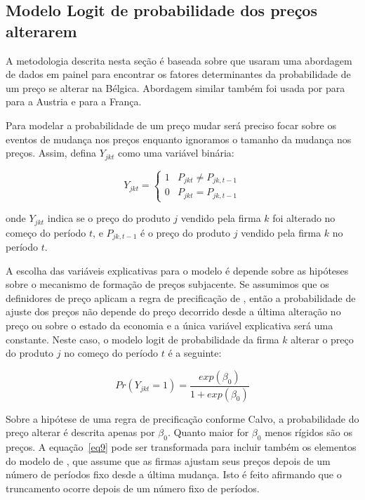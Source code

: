 \documentclass[twoside,a4paper,11pt]{report}
\begin{document}
\subsection*{Modelo Logit de probabilidade dos preços alterarem}

A metodologia descrita nesta seção é baseada sobre \citet{aucremanne2005time} que usaram uma abordagem de dados em painel para encontrar os fatores determinantes da probabilidade de um preço se alterar na Bélgica. Abordagem similar também foi usada por \citet{lunnemann2005consumer} para \citet{baumgartner2005frequently} para a Austria e \citet{baudry2004price} para a França.

Para modelar a probabilidade de um preço mudar será preciso focar sobre os eventos de mudança nos preços enquanto ignoramos o tamanho da mudança nos preços. Assim, defina $Y_{jkt}$ como uma variável binária:

\begin{equation}\label{eq8}
Y_{jkt} =\begin{cases}1 &  P_{jkt} \neq P_{jk,t-1}\\0 & P_{jkt} = P_{jk,t-1}\end{cases}
\end{equation}

\noindent onde ${Y}_{jkt}$ indica se o preço do produto $j$ vendido pela firma $k$ foi alterado no começo do período $t$, e ${P}_{jk,t-1}$ é o preço do produto $j$ vendido pela firma $k$ no período $t$. 

A escolha das variáveis explicativas para o modelo é depende sobre as hipóteses sobre o mecanismo de formação de preços subjacente. Se assumimos que os definidores de preço aplicam a regra de precificação de \citet{calvo1983staggered}, então a probabilidade de ajuste dos preços não depende do preço decorrido desde a última alteração no preço ou sobre o estado da economia e a única variável explicativa será uma constante. Neste caso, o modelo logit de probabilidade da firma $k$ alterar o preço do produto $j$ no começo do período $t$ é a seguinte:

\begin{equation}\label{eq9}
Pr\left( { Y }_{ jkt }=1 \right) =\frac { exp\left( { \beta  }_{ 0 } \right)  }{ 1+exp\left( { \beta  }_{ 0 } \right)  } 
\end{equation}

Sobre a hipótese de uma regra de precificação conforme Calvo, a probabilidade do preço alterar é descrita apenas por ${ \beta  }_{ 0 }$. Quanto maior for ${ \beta  }_{ 0 }$ menos rígidos são os preços. A equação~\ref{eq9} pode ser transformada para incluir também os elementos do modelo de \citet{taylor1980aggregate}, que assume que as firmas ajustam seus preços depois de um número de períodos fixo desde a última mudança. Isto é feito afirmando que o truncamento ocorre depois de um número fixo de períodos.
\end{document}
